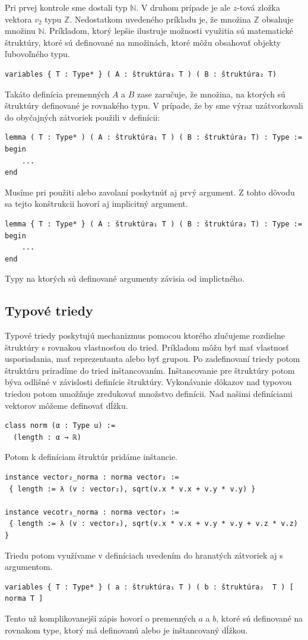 \documentclass[a4paper,10pt,oneside]{report}%
\begin{document}
    Pri prvej kontrole sme dostali typ $\mathbb{N}$.
    V druhom prípade je ale $z$-tová zložka vektora $v_{2}$ typu $\mathbb{Z}$.
    Nedostatkom uvedeného príkladu je, že množina $\mathbb{Z}$ obsahuje
množinu $\mathbb{N}$.
    Príkladom, ktorý lepšie ilustruje možnosti využitia sú matematické štruktúry,
ktoré sú definované na množinách, ktoré môžu obsahovať objekty ľubovoľného typu.
\begin{lstlisting}
variables { T : Type* } ( A : štruktúra₁ T ) ( B : štruktúra₂ T)
\end{lstlisting}
    Takáto definícia premenných $A$ a $B$ zase zaručuje, že množina, na ktorých sú
štruktúry definované je rovnakého typu.
    V prípade, že by sme výraz uzátvorkovali do obyčajných zátvoriek použili v
definícii:
\begin{lstlisting}
lemma ( T : Type* ) ( A : štruktúra₁ T ) ( B : štruktúra₂ T) : Type :=
begin
    ...
end
\end{lstlisting}
    Musíme pri použiti alebo zavolaní poskytnúť aj prvý argument.
    Z tohto dôvodu sa tejto konštrukcii hovorí aj implicitný argument.
\begin{lstlisting}
lemma { T : Type* } ( A : štruktúra₁ T ) ( B : štruktúra₂ T) : Type :=
begin
    ...
end
\end{lstlisting}
Typy na ktorých sú definované argumenty závisia od implictného.
\subsection{Typové triedy}
    Typové triedy poskytujú mechanizmus pomocou ktorého zlučujeme rozdielne štruktúry
s rovnakou vlastnosťou do tried.
    Príkladom môžu byť mať vlastnosť usporiadania, mať reprezentanta alebo
byť grupou.
    Po zadefinovaní triedy potom štruktúru priradíme do tried inštancovaním.
    Inštancovanie pre štruktúry potom býva odlišné v závislosti definície štruktúry.
    Vykonávanie dôkazov nad typovou triedou potom umožňuje zredukovať množstvo definícii.
    Nad našimi definíciami vektorov môžeme definovať dĺžku.
\begin{lstlisting}
class norm (α : Type u) :=
  (length : α → ℝ)
\end{lstlisting}
    Potom k definíciam štruktúr pridáme inštancie.
\begin{lstlisting}
instance vector₂_norma : norma vector₂ :=
 { length := λ (v : vector₂), sqrt(v.x * v.x + v.y * v.y) }

instance vecotr₃_norma : norma vector₃ :=
 { length := λ (v : vector₃), sqrt(v.x * v.x + v.y * v.y + v.z * v.z) }
\end{lstlisting}
    Triedu potom využívame v definíciach uvedením do hranatých zátvoriek aj s
argumentom.
\begin{lstlisting}
variables { T : Type* } ( a : štruktúra₁ T ) ( b : štruktúra₂  T ) [ norma T ]
\end{lstlisting}
    Tento už komplikovanejší zápis hovorí o premenných $a$ a $b$, ktoré sú definované
na rovnakom type, ktorý má definovanú alebo je inštancovaný dĺžkou.
\end{document}
